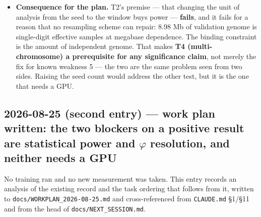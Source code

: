 \documentclass[11pt,a4paper]{article}
\newcommand{\code}[1]{\texttt{\small #1}}
\begin{document}
\begin{itemize}
\item \textbf{Consequence for the plan.} T2's premise --- that changing the unit
of analysis from the seed to the window buys power --- \textbf{fails}, and it
fails for a reason that no resampling scheme can repair: 8.98 Mb of validation
genome is single-digit effective samples at megabase dependence. The binding
constraint is the amount of independent genome. That makes \textbf{T4
(multi-chromosome) a prerequisite for any significance claim}, not merely the
fix for known weakness 5 --- the two are the same problem seen from two sides.
Raising the seed count would address the other test, but it is the one that
needs a GPU.

\end{itemize}

\subsection*{2026-08-25 (second entry) --- work plan written: the two blockers
on a positive result are statistical power and $\varphi$ resolution, and
neither needs a GPU}

No training ran and no new measurement was taken. This entry records an
analysis of the existing record and the task ordering that follows from it,
written to \code{docs/WORKPLAN\_2026-08-25.md} and cross-referenced from
\code{CLAUDE.md} \S1/\S11 and from the head of \code{docs/NEXT\_SESSION.md}.
\end{document}
